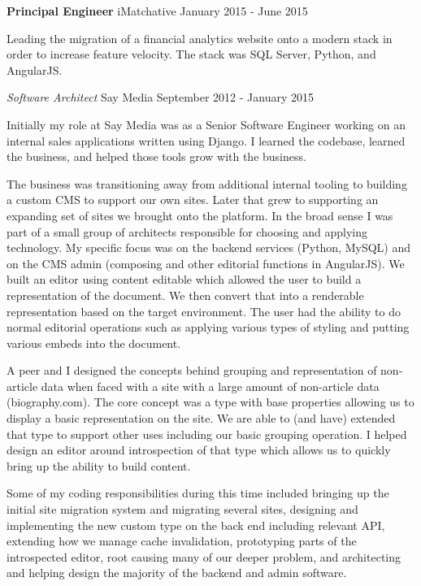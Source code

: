 \documentclass[margin]{res}
\begin{document}
\begin{resume}
                \textbf{Principal Engineer} iMatchative \hfill January 2015 - June 2015

                Leading the migration of a financial analytics website onto a modern stack
                in order to increase feature velocity.  The stack was SQL Server,
                Python, and AngularJS.
 
                {\sl\large Software Architect} Say Media \hfill September 2012 - January 2015

                Initially my role at Say Media was as a Senior Software Engineer working
                on an internal sales applications written using Django. I learned the
                codebase, learned the business, and helped those tools grow with the
                business.

                The business was transitioning away from additional internal tooling
                to building a custom CMS to support our own sites. Later that grew to
                supporting an expanding set of sites we brought onto the platform. In
                the broad sense I was part of a small group of architects responsible
                for choosing and applying technology. My specific focus was on the
                backend services (Python, MySQL) and on the CMS admin (composing and
                other editorial functions in AngularJS). We built an editor using
                content editable which allowed the user to build a representation of
                the document. We then convert that into a renderable representation
                based on the target environment. The user had the ability to do normal
                editorial operations such as applying various types of styling and
                putting various embeds into the document.

                A peer and I designed the concepts behind grouping and representation of
                non-article data when faced with a site with a large amount of non-article
                data (biography.com). The core concept was a type with base properties
                allowing us to display a basic representation on the site. We are able to
                (and have) extended that type to support other uses including our basic
                grouping operation. I helped design an editor around introspection of that
                type which allows us to quickly bring up the ability to build content.

                Some of my coding responsibilities during this time included bringing
                up the initial site migration system and migrating several sites,
                designing and implementing the new custom type on the back end including relevant API,
                extending how we manage cache invalidation, prototyping parts of the introspected editor,
                root causing many of our deeper problem, and architecting and helping
                design the majority of the backend and admin software.


\end{resume}
\end{document}
